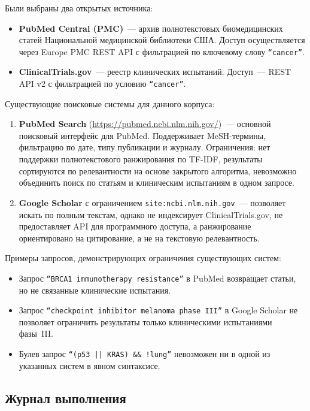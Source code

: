 \documentclass[a4paper,12pt]{article}
\begin{document}
Были выбраны два открытых источника:
\begin{itemize}
    \item \textbf{PubMed Central (PMC)}~--- архив полнотекстовых биомедицинских статей Национальной медицинской библиотеки США. Доступ осуществляется через Europe PMC REST API с фильтрацией по ключевому слову \texttt{``cancer''}.
    \item \textbf{ClinicalTrials.gov}~--- реестр клинических испытаний. Доступ~--- REST API v2 с фильтрацией по условию \texttt{``cancer''}.
\end{itemize}

Существующие поисковые системы для данного корпуса:
\begin{enumerate}
    \item \textbf{PubMed Search} (\url{https://pubmed.ncbi.nlm.nih.gov/})~--- основной поисковый интерфейс для PubMed. Поддерживает MeSH-термины, фильтрацию по дате, типу публикации и журналу. Ограничения: нет поддержки полнотекстового ранжирования по TF-IDF, результаты сортируются по релевантности на основе закрытого алгоритма, невозможно объединить поиск по статьям и клиническим испытаниям в одном запросе.
    \item \textbf{Google Scholar} с ограничением \texttt{site:ncbi.nlm.nih.gov}~--- позволяет искать по полным текстам, однако не индексирует ClinicalTrials.gov, не предоставляет API для программного доступа, а ранжирование ориентировано на цитирование, а не на текстовую релевантность.
\end{enumerate}

Примеры запросов, демонстрирующих ограничения существующих систем:
\begin{itemize}
    \item Запрос \texttt{``BRCA1 immunotherapy resistance''} в PubMed возвращает статьи, но не связанные клинические испытания.
    \item Запрос \texttt{``checkpoint inhibitor melanoma phase III''} в Google Scholar не позволяет ограничить результаты только клиническими испытаниями фазы~III.
    \item Булев запрос \texttt{``(p53 || KRAS) \&\& !lung''} невозможен ни в одной из указанных систем в явном синтаксисе.
\end{itemize}

\subsection{Журнал выполнения}
\end{document}
